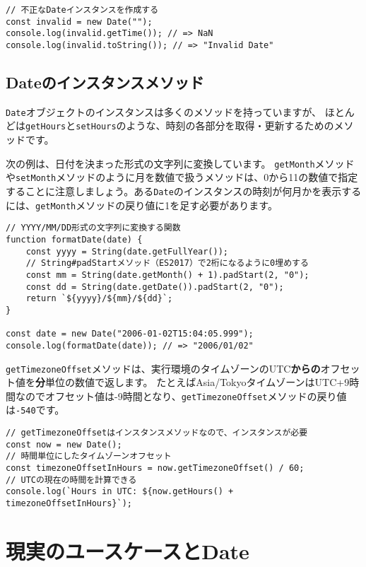 \begin{lstlisting}
// 不正なDateインスタンスを作成する
const invalid = new Date("");
console.log(invalid.getTime()); // => NaN
console.log(invalid.toString()); // => "Invalid Date"
\end{lstlisting}

\hypertarget{instance-method}{%
\subsection{Dateのインスタンスメソッド}\label{instance-method}}

\texttt{Date}オブジェクトのインスタンスは多くのメソッドを持っていますが、
ほとんどは\texttt{getHours}と\texttt{setHours}のような、時刻の各部分を取得・更新するためのメソッドです。

次の例は、日付を決まった形式の文字列に変換しています。
\texttt{getMonth}メソッドや\texttt{setMonth}メソッドのように月を数値で扱うメソッドは、0から11の数値で指定することに注意しましょう。ある\texttt{Date}のインスタンスの時刻が何月かを表示するには、\texttt{getMonth}メソッドの戻り値に1を足す必要があります。

\begin{lstlisting}
// YYYY/MM/DD形式の文字列に変換する関数
function formatDate(date) {
    const yyyy = String(date.getFullYear());
    // String#padStartメソッド（ES2017）で2桁になるように0埋めする
    const mm = String(date.getMonth() + 1).padStart(2, "0");
    const dd = String(date.getDate()).padStart(2, "0");
    return `${yyyy}/${mm}/${dd}`;
}

const date = new Date("2006-01-02T15:04:05.999");
console.log(formatDate(date)); // => "2006/01/02"
\end{lstlisting}

\texttt{getTimezoneOffset}メソッドは、実行環境のタイムゾーンのUTC\textbf{からの}オフセット値を\textbf{分}単位の数値で返します。
たとえばAsia/TokyoタイムゾーンはUTC+9時間なのでオフセット値は-9時間となり、\texttt{getTimezoneOffset}メソッドの戻り値は\texttt{-540}です。

\begin{lstlisting}
// getTimezoneOffsetはインスタンスメソッドなので、インスタンスが必要
const now = new Date();
// 時間単位にしたタイムゾーンオフセット
const timezoneOffsetInHours = now.getTimezoneOffset() / 60;
// UTCの現在の時間を計算できる
console.log(`Hours in UTC: ${now.getHours() + timezoneOffsetInHours}`);
\end{lstlisting}

\hypertarget{usecase}{%
\section{現実のユースケースとDate}\label{usecase}}

